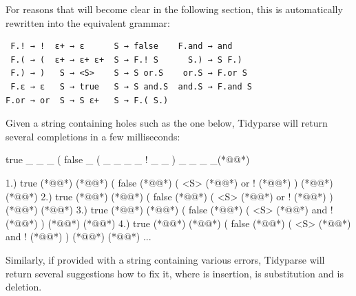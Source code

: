\documentclass[sigplan,nonacm]{acmart}\settopmatter{printfolios=false,printccs=false,printacmref=false}
\begin{document}
\noindent For reasons that will become clear in the following section, this is automatically rewritten into the equivalent grammar:

\begin{verbatim}
 F.! → !  ε+ → ε      S → false    F.and → and
 F.( → (  ε+ → ε+ ε+  S → F.! S      S.) → S F.)
 F.) → )   S → <S>    S → S or.S    or.S → F.or S
 F.ε → ε   S → true   S → S and.S  and.S → F.and S
F.or → or  S → S ε+   S → F.( S.)
\end{verbatim}


%

\noindent Given a string containing holes such as the one below, Tidyparse will return several completions in a few milliseconds:

\begin{tidyinput}
true _ _ _ ( false _ ( _ _ _ _ ! _ _ ) _ _ _ _(*@\caret{ }@*)
\end{tidyinput}

\begin{tidyoutput}
1.) true (*@@*) (*@\hlorange{!}@*) ( false (*@@*) ( <S> (*@\hlorange{)}@*) or ! (*@@*) ) (*@@*) (*@@*)
2.) true (*@@*) (*@\hlorange{!}@*) ( false (*@@*) ( <S> (*@\hlorange{)}@*) or ! (*@@*) ) (*@@*) (*@@*)
3.) true (*@@*) (*@\hlorange{!}@*) ( false (*@@*) ( <S> (*@\hlorange{)}@*) and ! (*@@*) ) (*@@*) (*@@*)
4.) true (*@@*) (*@\hlorange{!}@*) ( false (*@@*) ( <S> (*@\hlorange{)}@*) and ! (*@@*) ) (*@@*) (*@@*)
...
\end{tidyoutput}

\noindent Similarly, if provided with a string containing various errors, Tidyparse will return several suggestions how to fix it, where  is insertion,  is substitution and  is deletion.
\end{document}
